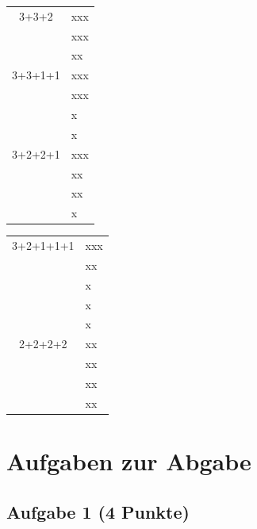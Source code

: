 \documentclass{article} %
\begin{document}
\begin{mybox}
\begin{tabular}{cl}
      3+3+2 & xxx \\
     & xxx\\
     & xx\\\hline
     3+3+1+1 & xxx\\
     & xxx\\
    &  x\\
     & x\\ \hline
     3+2+2+1 & xxx\\
     & xx\\
     & xx\\
     & x\\
\end{tabular}
\begin{tabular}{cl}
      3+2+1+1+1 & xxx\\
      & xx\\
      & x\\
      & x\\
      & x\\ \hline
      2+2+2+2 & xx\\
      & xx\\
      & xx\\
      & xx\\
\end{tabular}
\end{mybox}
\section*{Aufgaben zur Abgabe}
\subsection*{Aufgabe 1 (4 Punkte)}
\end{document}
